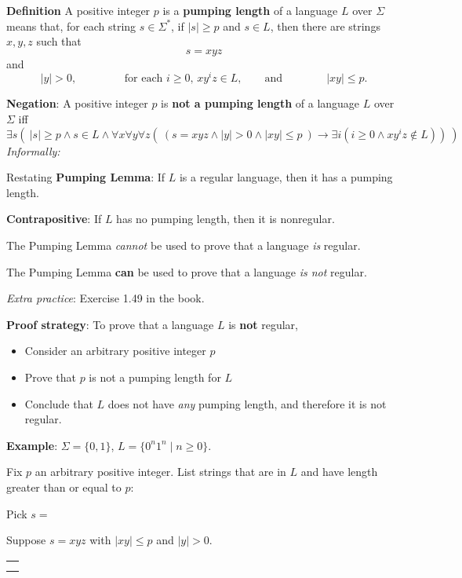 \documentclass[12pt, oneside]{article}
\begin{document}
{\bf Definition}  A positive integer $p$ is a {\bf pumping length} of a language $L$ over $\Sigma$ means
that, for each string $s  \in  \Sigma^*$, if  $|s| \geq p$ and $s \in L$, then there are strings $x,y,z$
such that 
\[
s = xyz
\]
and  
\[
|y| > 0,  \qquad \qquad 
\text{ for each $i \geq 0$, $xy^i z \in L$}, \qquad \text{and}
\qquad  \qquad
|xy| \leq p.
\]

{\bf Negation}: A positive integer  $p$  is {\bf not a pumping length} of a language  $L$ over  $\Sigma$  iff
\[
\exists s \left(~  |s| \geq  p \wedge s \in L \wedge \forall x \forall y \forall z  \left( ~\left( s = xyz \wedge 
|y| > 0 \wedge |xy| \leq p~ \right) \to \exists i  (  i \geq 0  \wedge xy^iz  \notin L ) \right) ~\right) 
\]
{\it Informally: }


Restating {\bf Pumping Lemma}: If $L$ is a regular language, then it  has
a pumping length.


{\bf Contrapositive}: If $L$ has no pumping length, then  it is nonregular.

\vfill

{\Large The Pumping Lemma {\it cannot} be used to prove that a language {\it is} regular.} 

{\Large The Pumping Lemma {\bf can} be used to prove that a language {\it is not} regular.}

{\it Extra practice}: Exercise 1.49 in the book.


\vfill

{\bf Proof strategy}: To prove that a language $L$ is {\bf not} regular, 
\begin{itemize}
    \item Consider an arbitrary positive integer $p$
    \item Prove that $p$ is not a pumping length for $L$
    \item Conclude that $L$ does not have {\it any} pumping length, and therefore it is not regular.
\end{itemize}

\newpage
{\bf Example}: $\Sigma  =  \{0,1\}$, $L = \{ 0^n 1^n \mid n  \geq 0\}$.

Fix $p$ an arbitrary positive integer. List strings that are in $L$ and have length  greater than or equal  to $p$:

\vspace{20pt}

Pick $s = $


Suppose $s = xyz$ with  $|xy|  \leq  p$ and $|y| > 0$.
\begin{center}
\begin{tabular}{|c|}
\hline
 \\
\hspace{4in} \\
\hline
\end{tabular}
\end{center}
\end{document}

